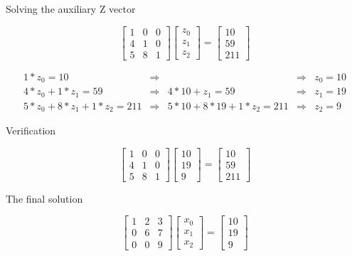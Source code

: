 Solving the auxiliary Z vector

\begin{equation}
\begin{bmatrix}
	1 & 0 & 0 \\
	4 & 1 & 0 \\
	5 & 8 & 1
\end{bmatrix}
\begin{bmatrix}
	z_0 \\
	z_1 \\
	z_2
\end{bmatrix}
=
\begin{bmatrix}
	10 \\
	59 \\
	211
\end{bmatrix}
\end{equation}

\begin{equation}
\begin{array}{llllll}
	1 * z_0 = 10 & \Rightarrow & & \Rightarrow & z_0 = 10 \\
	4 * z_0 + 1 * z_1 = 59 & \Rightarrow & 4 * 10 + z_1 = 59 & \Rightarrow & z_1 = 19 \\
	5 * z_0 + 8 * z_1 + 1 * z_2 = 211 & \Rightarrow & 5 * 10 + 8 * 19 + 1 * z_2 = 211 & \Rightarrow & z_2 = 9
\end{array}
\end{equation}

Verification

\begin{equation}
\begin{bmatrix}
	1 & 0 & 0 \\
	4 & 1 & 0 \\
	5 & 8 & 1
\end{bmatrix}
\begin{bmatrix}
	10 \\
	19 \\
	9
\end{bmatrix}
=
\begin{bmatrix}
	10 \\
	59 \\
	211
\end{bmatrix}
\end{equation}

The final solution

\begin{equation}
\begin{bmatrix}
	1 & 2 & 3 \\
	0 & 6 & 7 \\
	0 & 0 & 9
\end{bmatrix}
\begin{bmatrix}
	x_0 \\
	x_1 \\
	x_2
\end{bmatrix}
=
\begin{bmatrix}
	10 \\
	19 \\
	9
\end{bmatrix}
\end{equation}

